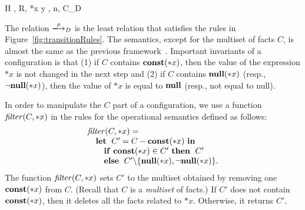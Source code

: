 \begin{figure*}
\begin{minipage}{\textwidth}
{ \langle H , R, *x \leftarrow y , n, C\rangle \xlongrightarrow{}_{D}
  \CONSTEX}



\end{minipage}

\caption{Operational semantics of \(\mathcal{L}\).}
\label{fig:transitionRules}
\end{figure*}

The relation $\xlongrightarrow{\rho}_D$ is the least relation that
satisfies the rules in Figure~\ref{fig:transitionRules}.  The semantics,
except for the multiset of facts $C$, is almost the same as the previous
framework~\cite{}.  Important invariants of a configuration is that (1)
if $C$ contains $\mathbf{const}(*x)$, then the value of the expression $*x$ is
not changed in the next step and (2) if $C$ contains $\mathbf{null}(*x)$ (resp.,
$\neg\mathbf{null}(*x)$), then the value of $*x$ is equal to $\mathbf{null}$ (resp., not equal
to null).

In order to manipulate the $C$ part of a configuration, we use a
function $\mathit{filter}(C, *x)$ in the rules for the operational semantics
defined as follows:
\[
\begin{array}{l}
 \mathit{filter}(C, *x) =\\
 \quad \mathbf{let}\;\ C' = C - \mathbf{const}(*x)\ \mathbf{in}\;\\
 \quad\quad \mathbf{if}\ \mathbf{const}(*x) \in C'\ \mathbf{then}\;\ C'\\
 \quad\quad \mathbf{else}\;\ C'\backslash\{\mathbf{null}(*x),\neg\mathbf{null}(*x)\}.
\end{array}
\]
The function $\mathit{filter}(C, *x)$ sets $C'$ to the multiset obtained by
removing one $\mathbf{const}(*x)$ from $C$.  (Recall that $C$ is a
\emph{multiset} of facts.)  If $C'$ does not contain $\mathbf{const}(*x)$, then
it deletes all the facts related to $*x$.  Otherwise, it returns $C'$.

